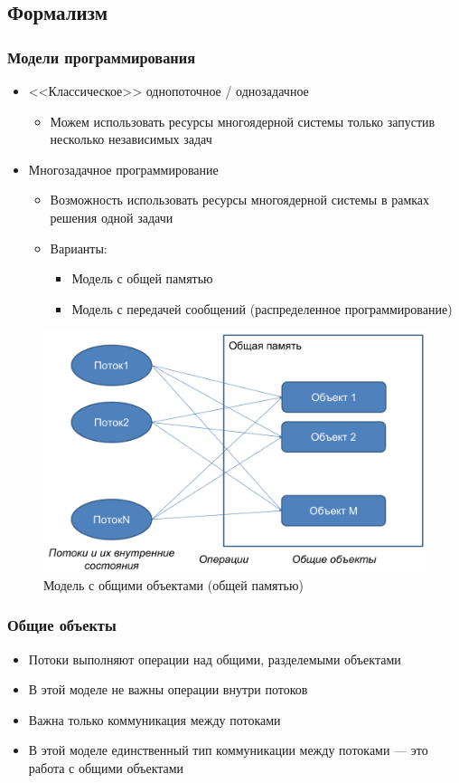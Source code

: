 \documentclass[10pt,a4paper,oneside,titlepage]{article}
\theoremstyle{plain}
\theoremstyle{defenition}
\begin{document}
\subsection{Формализм}
\subsubsection{Модели программирования}
\begin{itemize}
	\item <<Классическое>> однопоточное / однозадачное
	\begin{itemize}
		\item Можем использовать ресурсы многоядерной системы только запустив несколько независимых задач
	\end{itemize}
    \item Многозадачное программирование
    \begin{itemize}
    	\item Возможность использовать ресурсы многоядерной системы в рамках решения одной задачи
    	\item Варианты:
    	\begin{itemize}
    		\item Модель с общей памятью
    		\item Модель с передачей сообщений (распределенное программирование)
    	\end{itemize}
    \end{itemize}
\end{itemize}

\begin{figure}[h]
	\centering
	\includegraphics[width=0.7\linewidth]{pictures/CommonMemory}
	\caption{Модель с общими объектами (общей памятью)}
	\label{fig:commonmemory}
\end{figure}

\subsubsection{Общие объекты}
\begin{itemize}
	\item Потоки выполняют операции над общими, разделемыми объектами
	\item В этой моделе не важны операции внутри потоков
	\item Важна только коммуникация между потоками
	\item В этой моделе единственный тип коммуникации между потоками --- это работа с общими объектами
\end{itemize}
\end{document}
